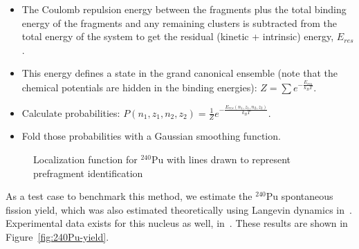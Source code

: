 \begin{itemize}
	\item The Coulomb repulsion energy between the fragments plus the total binding energy of the fragments and any remaining clusters is subtracted from the total energy of the system to get the residual (kinetic + intrinsic) energy, $E_{res}$.
	\item This energy defines a state in the grand canonical ensemble (note that the chemical potentials are hidden in the binding energies): $Z = \sum e^{-\frac{E_{res}}{k_BT}}$.
	\item Calculate probabilities: $P(n_1,z_1,n_2,z_2) = \frac{1}{Z} e^{-\frac{E_{res}(n_1,z_1,n_2,z_2)}{k_BT}}$.
	\item Fold those probabilities with a Gaussian smoothing function.
\end{itemize}

\begin{figure}%
	\centering
	\qquad
	\caption{Localization function for $^{240}$Pu with lines drawn to represent prefragment identification}%
	\label{fig:methods240Pulocali}%
\end{figure}


As a test case to benchmark this method, we estimate the $^{240}$Pu spontaneous fission yield, which was also estimated theoretically using Langevin dynamics in~\cite{Sadhukhan2016}. Experimental data exists for this nucleus as well, in~\cite{Laidler1962, Thierens1981}. These results are shown in Figure~\ref{fig:240Pu-yield}.

